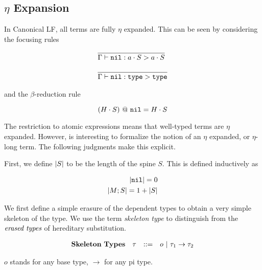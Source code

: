 \documentclass[11pt,twoside]{article}
\begin{document}

\subsection{$\eta$ Expansion}

In Canonical LF, all terms are fully $\eta$ expanded.  This can be seen
by considering the focusing rules

$$
\begin{array}{lr}
\infer{\Focus{\Nil}{a\cdot S}{a\cdot S}}{}\\
\\
\infer{\Focus{\Nil}{\Type}{\Type}}{} 
\end{array} 
$$

and the $\beta$-reduction rule

$$
(H\cdot S)~@~\mathtt{nil} = H\cdot S
$$

The restriction to atomic expressions means that well-typed terms
are $\eta$ expanded.  However, is interesting to formalize the notion
of an $\eta$ expanded, or $\eta$-long term.  The following judgments
make this explicit.

First, we define $\left|S\right|$ to be the length of the spine $S$.  
This is defined inductively as 

\begin{align*} 
\left|\mathtt{nil}\right| = 0\\
\left|M;S\right| = 1 + \left|S\right|
\end{align*} 

We first define a simple erasure of the dependent types to obtain
a very simple skeleton of the type.  We use the term \emph{skeleton type}
to distinguish from the $\emph{erased types}$ of hereditary substitution.

\newcommand{\Skel}[3][\Gamma]{#1\vdash #2 \rightsquigarrow #3}
\newcommand{\SkBase}{o}
\newcommand{\tauskel}{\tau_1\to\tau_2\to\ldots\to\tau_n\to\SkBase}

$$
\begin{array}{llll}
\mathbf{Skeleton\ Types} & \tau & ::= & \SkBase \Spb \tau_1\to\tau_2 \\
\end{array} 
$$

$o$ stands for any base type, $\to$ for any pi type.

\bigskip 
\framebox{$\Skel{A}{\tau}$}
\bigskip 
\end{document}
